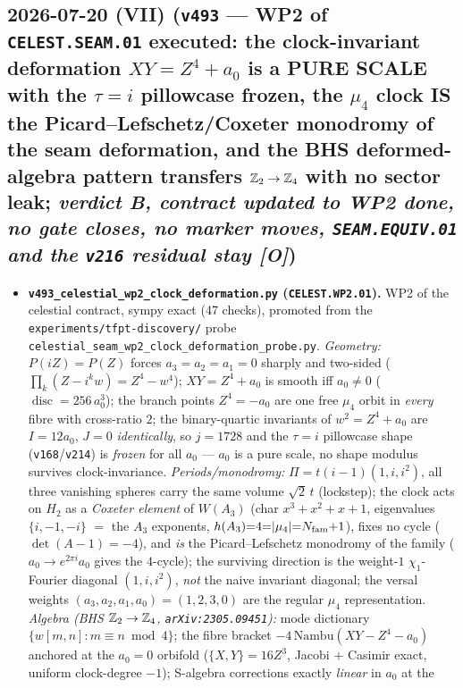 \documentclass[11pt]{article}
\providecommand{\mO}{\textbf{[O]}}\providecommand{\mX}{\textbf{[X]}}
\begin{document}
\subsection*{2026-07-20 (VII) (\texttt{v493} --- WP2 of \texttt{CELEST.SEAM.01} executed: the clock-invariant deformation $XY{=}Z^4{+}a_0$ is a PURE SCALE with the $\tau{=}i$ pillowcase frozen, the $\mu_4$ clock IS the Picard--Lefschetz/Coxeter monodromy of the seam deformation, and the BHS deformed-algebra pattern transfers $\mathbb{Z}_2\to\mathbb{Z}_4$ with no sector leak; \emph{verdict B, contract updated to WP2 done, no gate closes, no marker moves, \texttt{SEAM.EQUIV.01} and the \texttt{v216} residual stay \mO})}
\begin{itemize}[leftmargin=1.5em]
\item \textbf{\texttt{v493\_celestial\_wp2\_clock\_deformation.py} (\texttt{CELEST.WP2.01}).} WP2 of the
celestial contract, sympy exact (47 checks), promoted from the \texttt{experiments/tfpt-discovery/}
probe \texttt{celestial\_seam\_wp2\_clock\_deformation\_probe.py}. \emph{Geometry:}
$P(iZ){=}P(Z)$ forces $a_3{=}a_2{=}a_1{=}0$ sharply and two-sided
($\prod_k(Z-i^kw)=Z^4-w^4$); $XY{=}Z^4{+}a_0$ is smooth iff $a_0{\neq}0$
($\operatorname{disc}=256\,a_0^3$); the branch points $Z^4{=}{-}a_0$ are one free $\mu_4$ orbit in
\emph{every} fibre with cross-ratio $2$; the binary-quartic invariants of $w^2{=}Z^4{+}a_0$ are $I{=}12a_0$,
$J{=}0$ \emph{identically}, so $j{=}1728$ and the $\tau{=}i$ pillowcase shape
(\texttt{v168}/\texttt{v214}) is \emph{frozen} for all $a_0$ --- $a_0$ is a pure scale, no shape modulus
survives clock-invariance. \emph{Periods/monodromy:} $\Pi=t(i{-}1)(1,i,i^2)$, all three vanishing spheres
carry the same volume $\sqrt2\,t$ (lockstep); the clock acts on $H_2$ as a \emph{Coxeter element} of
$W(A_3)$ (char $x^3{+}x^2{+}x{+}1$, eigenvalues $\{i,-1,-i\}$ $=$ the $A_3$ exponents,
$h(A_3){=}4{=}|\mu_4|{=}N_{\mathrm{fam}}{+}1$), fixes no cycle ($\det(A{-}1){=}{-}4$), and \emph{is} the
Picard--Lefschetz monodromy of the family ($a_0\to e^{2\pi i}a_0$ gives the $4$-cycle); the surviving
direction is the weight-$1$ $\chi_1$-Fourier diagonal $(1,i,i^2)$, \emph{not} the naive invariant diagonal;
the versal weights $(a_3,a_2,a_1,a_0)=(1,2,3,0)$ are the regular $\mu_4$ representation. \emph{Algebra
(BHS $\mathbb{Z}_2\to\mathbb{Z}_4$, \texttt{arXiv:2305.09451}):} mode dictionary $\{w[m,n]:m{\equiv}n\bmod4\}$; the fibre
bracket $-4\,\mathrm{Nambu}(XY{-}Z^4{-}a_0)$ anchored at the $a_0{=}0$ orbifold ($\{X,Y\}{=}16Z^3$, Jacobi
$+$ Casimir exact, uniform clock-degree $-1$); S-algebra corrections exactly \emph{linear} in $a_0$ at the

\end{itemize}
\end{document}
